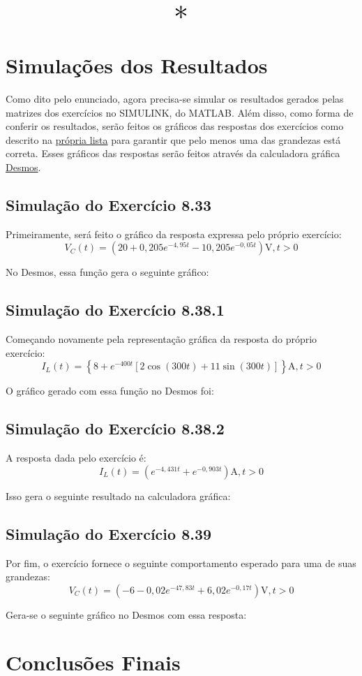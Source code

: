 \documentclass{report}
\let\oldsection\section
\renewcommand\section{\clearpage\oldsection}
\begin{document}
\begin{center}
      \[ \scalebox{3}{$ * $} \]
\end{center}

\section{Simulações dos Resultados}
Como dito pelo enunciado, agora precisa-se simular os resultados gerados pelas matrizes dos exercícios no SIMULINK, do MATLAB. Além disso, como forma de conferir os resultados,
serão feitos os gráficos das respostas dos exercícios como descrito na \href{https://www.ece.ufrgs.br/~fetter/eng10001/listas/circuitos_2a_ordem.pdf}{própria lista} para garantir que pelo menos uma das grandezas está correta. Esses gráficos das respostas
serão feitos através da calculadora gráfica \href{https://www.desmos.com/calculator}{Desmos}.

\subsection{Simulação do Exercício 8.33}
Primeiramente, será feito o gráfico da resposta expressa pelo próprio exercício:
$$ V_C(t) = \left(20 + 0,\!205e^{-4,95t} - 10,\!205e^{-0,05t}\right)\text{V}, t > 0 $$

No Desmos, essa função gera o seguinte gráfico:


\subsection{Simulação do Exercício 8.38.1}
Começando novamente pela representação gráfica da resposta do próprio exercício:
$$ I_L(t) = \left\{8 + e^{-400t}\left[2\cos(300t) + 11\sin(300t)\right]\right\}\text{A}, t > 0 $$

O gráfico gerado com essa função no Desmos foi:

\subsection{Simulação do Exercício 8.38.2}
A resposta dada pelo exercício é:
$$ I_L(t) = \left(e^{-4,431t} + e^{-0,903t}\right)\text{A}, t > 0 $$

Isso gera o seguinte resultado na calculadora gráfica:

\subsection{Simulação do Exercício 8.39}
Por fim, o exercício fornece o seguinte comportamento esperado para uma de suas grandezas:
$$ V_C(t) = \left(-6 -0,\!02e^{-47,83t} + 6,\!02e^{-0,17t}\right)\text{V}, t > 0 $$

Gera-se o seguinte gráfico no Desmos com essa resposta:

\section{Conclusões Finais}
\end{document}
